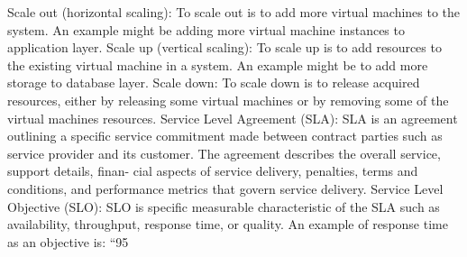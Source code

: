 Scale out (horizontal scaling): To scale out is to add more virtual machines to the system. An example might be adding more virtual machine instances to application layer.
Scale up (vertical scaling): To scale up is to add resources to the existing virtual machine in a system. An example might be to add more storage to database layer.
Scale down: To scale down is to release acquired resources, either by releasing some virtual machines or by removing some of the virtual machines resources.
Service Level Agreement (SLA): SLA is an agreement outlining a specific service commitment made between contract parties such as service provider and its customer. The agreement describes the overall service, support details, finan- cial aspects of service delivery, penalties, terms and conditions, and performance metrics that govern service delivery.
Service Level Objective (SLO): SLO is specific measurable characteristic of the SLA such as availability, throughput, response time, or quality. An example of response time as an objective is: ``95%
